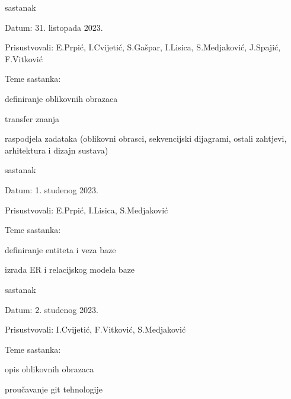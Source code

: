 \begin{packed_enum}
			\item  sastanak
			\item[] \begin{packed_item}
				\item Datum: 31. listopada 2023.
				\item Prisustvovali: E.Prpić, I.Cvijetić, S.Gašpar, I.Lisica, S.Medjaković, J.Spajić, F.Vitković
				\item Teme sastanka:
				\begin{packed_item}
					\item  definiranje oblikovnih obrazaca
					\item  transfer znanja
					\item  raspodjela zadataka (oblikovni obrasci, sekvencijski dijagrami, ostali zahtjevi, arhitektura i dizajn sustava)
				\end{packed_item}
			\end{packed_item}
			
			\item  sastanak
			\item[] \begin{packed_item}
				\item Datum: 1. studenog 2023.
				\item Prisustvovali: E.Prpić, I.Lisica, S.Medjaković
				\item Teme sastanka:
				\begin{packed_item}
					\item  definiranje entiteta i veza baze
					\item  izrada ER i relacijskog modela baze
				\end{packed_item}
			\end{packed_item}
			
			\item  sastanak
			\item[] \begin{packed_item}
				\item Datum: 2. studenog 2023.
				\item Prisustvovali: I.Cvijetić, F.Vitković, S.Medjaković
				\item Teme sastanka:
				\begin{packed_item}
					\item  opis oblikovnih obrazaca
					\item  proučavanje git tehnologije
				\end{packed_item}
			\end{packed_item}
			

\end{packed_enum}
